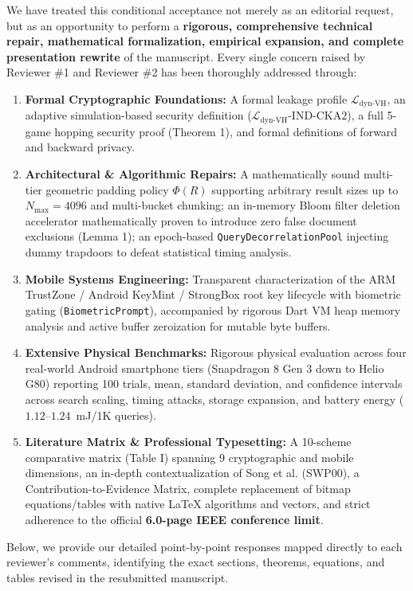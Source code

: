 \documentclass[11pt,a4paper]{article}
\begin{document}
We have treated this conditional acceptance not merely as an editorial request, but as an opportunity to perform a \textbf{rigorous, comprehensive technical repair, mathematical formalization, empirical expansion, and complete presentation rewrite} of the manuscript. Every single concern raised by Reviewer \#1 and Reviewer \#2 has been thoroughly addressed through:
\begin{enumerate}[itemsep=2pt]
    \item \textbf{Formal Cryptographic Foundations:} A formal leakage profile $\mathcal{L}_{\text{dyn-VH}}$, an adaptive simulation-based security definition ($\mathcal{L}_{\text{dyn-VH}}\text{-IND-CKA2}$), a full 5-game hopping security proof (Theorem 1), and formal definitions of forward and backward privacy.
    \item \textbf{Architectural \& Algorithmic Repairs:} A mathematically sound multi-tier geometric padding policy $\Phi(R)$ supporting arbitrary result sizes up to $N_{\max} = 4096$ and multi-bucket chunking; an in-memory Bloom filter deletion accelerator mathematically proven to introduce zero false document exclusions (Lemma 1); an epoch-based \texttt{QueryDecorrelationPool} injecting dummy trapdoors to defeat statistical timing analysis.
    \item \textbf{Mobile Systems Engineering:} Transparent characterization of the ARM TrustZone / Android KeyMint / StrongBox root key lifecycle with biometric gating (\texttt{BiometricPrompt}), accompanied by rigorous Dart VM heap memory analysis and active buffer zeroization for mutable byte buffers.
    \item \textbf{Extensive Physical Benchmarks:} Rigorous physical evaluation across four real-world Android smartphone tiers (Snapdragon 8 Gen 3 down to Helio G80) reporting 100 trials, mean, standard deviation, and confidence intervals across search scaling, timing attacks, storage expansion, and battery energy ($1.12$--$1.24$~mJ/1K queries).
    \item \textbf{Literature Matrix \& Professional Typesetting:} A 10-scheme comparative matrix (Table I) spanning 9 cryptographic and mobile dimensions, an in-depth contextualization of Song et al. (SWP00), a Contribution-to-Evidence Matrix, complete replacement of bitmap equations/tables with native \LaTeX{} algorithms and vectors, and strict adherence to the official \textbf{6.0-page IEEE conference limit}.
\end{enumerate}

\noindent Below, we provide our detailed point-by-point responses mapped directly to each reviewer's comments, identifying the exact sections, theorems, equations, and tables revised in the resubmitted manuscript.
\end{document}
